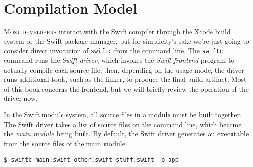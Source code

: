 \documentclass[../generics]{subfiles}
\begin{document}
\chapter{Compilation Model}\label{chap:compilation model}

\lettrine{M}{ost developers} interact with the Swift compiler through the Xcode build system or the Swift package manager, but for simplicity's sake we're just going to consider direct invocation of \texttt{swiftc} from the command line. The \texttt{swiftc} command runs the \emph{Swift driver}, which invokes the \emph{Swift frontend} program to actually compile each source file; then, depending on the usage mode, the driver runs additional tools, such as the linker, to produce the final build artifact. Most of this book concerns the frontend, but we will briefly review the operation of the driver now.

In the Swift module system, all source files in a module must be built together. The Swift driver takes a list of source files on the command line, which become the \emph{main module} being built. By default, the Swift driver generates an executable from the source files of the main module:
\begin{Verbatim}
$ swiftc main.swift other.swift stuff.swift -o app
\end{Verbatim}
\end{document}
